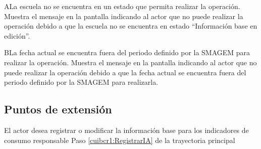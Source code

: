  \begin{UCtrayectoriaA}{A}{La escuela no se encuentra en un estado que permita realizar la operación.}
    \UCpaso[\UCsist] Muestra el mensaje  en la pantalla   indicando al actor que no puede realizar la operación debido a que la escuela no se encuentra en estado ``Información base en edición''. 
 \end{UCtrayectoriaA}
 
     \begin{UCtrayectoriaA}{B}{La fecha actual se encuentra fuera del periodo definido por la SMAGEM para realizar la operación.}
    \UCpaso[\UCsist] Muestra el mensaje  en la pantalla   indicando al actor que no puede realizar la operación debido a que la fecha actual se encuentra fuera del periodo definido por la SMAGEM para realizarla. 
 \end{UCtrayectoriaA}


\subsection{Puntos de extensión}

\UCExtensionPoint
{El actor desea registrar o modificar la información base para los indicadores de consumo responsable}
{ Paso \ref{cuibcr1:RegistrarIA} de la trayectoria principal}
{}
